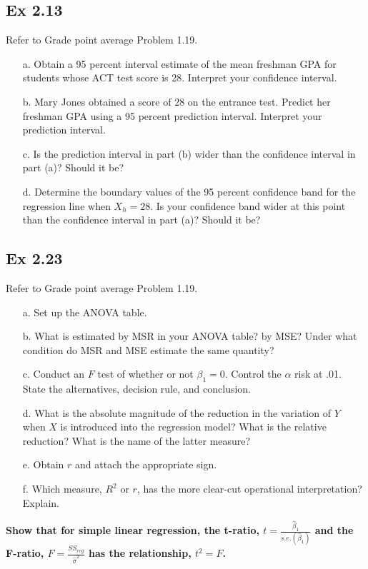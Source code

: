 \documentclass[10pt]{report}
\begin{document}
\subsection*{Ex 2.13}
Refer to Grade point average Problem 1.19.
\begin{enumerate}
	\item [a.]
	Obtain a 95 percent interval estimate of the mean freshman GPA for students whose ACT test score is 28. Interpret your confidence interval.
	
	\item [b.]
	Mary Jones obtained a score of 28 on the entrance test. Predict her freshman GPA using a 95 percent prediction interval. Interpret your prediction interval.
	
	\item [c.]
	Is the prediction interval in part (b) wider than the confidence interval in part (a)? Should it be?
	
	\item [d.]
	Determine the boundary values of the 95 percent confidence band for the regression line when $X_h = 28$. Is your confidence band wider at this point than the confidence interval in part (a)? Should it be?
\end{enumerate}

\subsection*{Ex 2.23}
Refer to Grade point average Problem 1.19.
\begin{enumerate}
	\item [a.]
	Set up the ANOVA table.
	
	\item [b.]
	What is estimated by MSR in your ANOVA table? by MSE? Under what condition do MSR and MSE estimate the same quantity?
	
	\item [c.]
	Conduct an $F$ test of whether or not $\beta_1 = 0$. Control the $\alpha$ risk at .01. State the alternatives, decision rule, and conclusion.
	
	\item [d.]
	What is the absolute magnitude of the reduction in the variation of $Y$ when $X$ is introduced into the regression model? What is the relative reduction? What is the name of the latter measure?
	
	\item [e.]
	Obtain $r$ and attach the appropriate sign.
	
	\item [f.]
	Which measure, $R^2$ or $r$, has the more clear-cut operational interpretation? Explain.
\end{enumerate}

{\large\bf Show that for simple linear regression, the t-ratio, $t=\frac{\hat{\beta}_1}{s.e.(\hat{\beta}_1)}$ and the F-ratio, $F=\frac{SS_{reg}}{\hat{\sigma}^2}$ has the relationship, $t^2=F$.}
\end{document}
